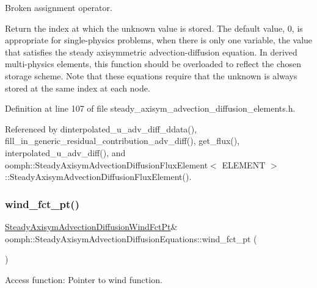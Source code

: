 Broken assignment operator. 

Return the index at which the unknown value is stored. The default value, 0, is appropriate for single-\/physics problems, when there is only one variable, the value that satisfies the steady axisymmetric advection-\/diffusion equation. In derived multi-\/physics elements, this function should be overloaded to reflect the chosen storage scheme. Note that these equations require that the unknown is always stored at the same index at each node. 

Definition at line 107 of file steady\+\_\+axisym\+\_\+advection\+\_\+diffusion\+\_\+elements.\+h.



Referenced by dinterpolated\+\_\+u\+\_\+adv\+\_\+diff\+\_\+ddata(), fill\+\_\+in\+\_\+generic\+\_\+residual\+\_\+contribution\+\_\+adv\+\_\+diff(), get\+\_\+flux(), interpolated\+\_\+u\+\_\+adv\+\_\+diff(), and oomph\+::\+Steady\+Axisym\+Advection\+Diffusion\+Flux\+Element$<$ E\+L\+E\+M\+E\+N\+T $>$\+::\+Steady\+Axisym\+Advection\+Diffusion\+Flux\+Element().

\mbox{\label{classoomph_1_1SteadyAxisymAdvectionDiffusionEquations_a725fab19401c9e97023b2099bd9c29ed}} 
\subsubsection{\texorpdfstring{wind\+\_\+fct\+\_\+pt()}{wind\_fct\_pt()}\hspace{0.1cm}{\footnotesize\ttfamily [1/2]}}
{\footnotesize\ttfamily \hyperlink{classoomph_1_1SteadyAxisymAdvectionDiffusionEquations_af8fad98c36589cff579a35bd32641b25}{Steady\+Axisym\+Advection\+Diffusion\+Wind\+Fct\+Pt}\& oomph\+::\+Steady\+Axisym\+Advection\+Diffusion\+Equations\+::wind\+\_\+fct\+\_\+pt (\begin{DoxyParamCaption}{ }\end{DoxyParamCaption})\hspace{0.3cm}{\ttfamily [inline]}}



Access function\+: Pointer to wind function. 



